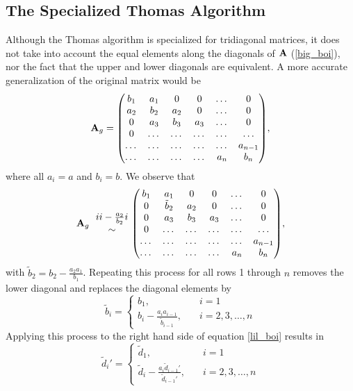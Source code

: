 \documentclass[notitlepage, reprint, nofootinbib]{revtex4-1}
\begin{document}
\subsection{The Specialized Thomas Algorithm }
Although the Thomas algorithm is specialized for tridiagonal matrices, it does not take into account the equal elements along the diagonals of $\vb{A}$ (\ref{big_boi}), nor the fact that the upper and lower diagonals are equivalent. A more accurate generalization of the original matrix would be 
\begin{equation}\label{another_big_boi}\vb{A}_g = \mqty(b_1&a_1&0&0&\dots&0\\a_2&b_2&a_2&0&\dots&0\\0&a_3&b_3&a_3&\dots&0\\ 0&\dots&\dots&\dots&\dots&\dots\\ \dots&\dots&\dots&\dots&\dots&a_{n-1}\\ \dots&\dots&\dots&\dots&a_n&b_n),\end{equation}
where all $a_i=a$ and $b_i=b$. We observe that 
$$\vb{A}_g\ \ \mqty{\uppercase\expandafter{\romannumeral 2}-\frac{a_2}{b_2}\uppercase\expandafter{\romannumeral 1}\\ \sim}\ \mqty(b_1&a_1&0&0&\dots&0\\0&\tilde{b}_2&a_2&0&\dots&0\\0&a_3&b_3&a_3&\dots&0\\ 0&\dots&\dots&\dots&\dots&\dots\\ \dots&\dots&\dots&\dots&\dots&a_{n-1}\\ \dots&\dots&\dots&\dots&a_n&b_n),$$
with $\tilde{b}_2=b_2-\frac{a_2a_1}{b_1}$. Repeating this process for all rows 1 through $n$ removes the lower diagonal and replaces the diagonal elements by
\begin{equation}\label{b_tilde_ein} \tilde{b}_i=\begin{cases} b_1, \quad &i=1 \\ b_i - \frac{a_i a_{i-1}}{\tilde{b}_{i-1}},\quad &i=2, 3,\dots, n\end{cases}\end{equation}
Applying this process to the right hand side of equation \ref{lil_boi} results in
\begin{equation}\label{d_tilde_ein}\tilde{d}_i'=\begin{cases}\tilde{d}_1,\quad &i=1\\ \tilde{d}_i-\frac{a_i \tilde{d}_{i-1}'}{\tilde{d}_{i-1}'},\quad&i=2,3,\dots,n\end{cases}\end{equation}
\end{document}

